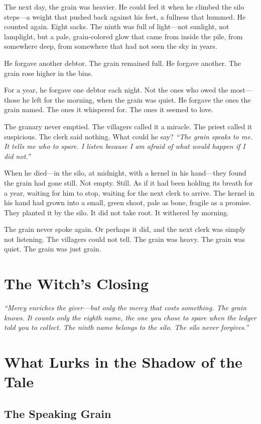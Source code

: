 The next day, the grain was heavier. He could feel it when he climbed the silo steps—a weight that pushed back against his feet, a fullness that hummed. He counted again. Eight sacks. The ninth was full of light—not sunlight, not lamplight, but a pale, grain-colored glow that came from inside the pile, from somewhere deep, from somewhere that had not seen the sky in years.

He forgave another debtor. The grain remained full. He forgave another. The grain rose higher in the bins.

For a year, he forgave one debtor each night. Not the ones who owed the most—those he left for the morning, when the grain was quiet. He forgave the ones the grain named. The ones it whispered for. The ones it seemed to love.

The granary never emptied. The villagers called it a miracle. The priest called it suspicious. The clerk said nothing. What could he say? \textit{``The grain speaks to me. It tells me who to spare. I listen because I am afraid of what would happen if I did not.''}

When he died—in the silo, at midnight, with a kernel in his hand—they found the grain had gone still. Not empty. Still. As if it had been holding its breath for a year, waiting for him to stop, waiting for the next clerk to arrive. The kernel in his hand had grown into a small, green shoot, pale as bone, fragile as a promise. They planted it by the silo. It did not take root. It withered by morning.

The grain never spoke again. Or perhaps it did, and the next clerk was simply not listening. The villagers could not tell. The grain was heavy. The grain was quiet. The grain was just grain.

\section*{The Witch's Closing}
\textit{``Mercy enriches the giver—but only the mercy that costs something. The grain knows. It counts only the eighth name, the one you chose to spare when the ledger told you to collect. The ninth name belongs to the silo. The silo never forgives.''}

\section*{What Lurks in the Shadow of the Tale}

\subsection*{The Speaking Grain}

